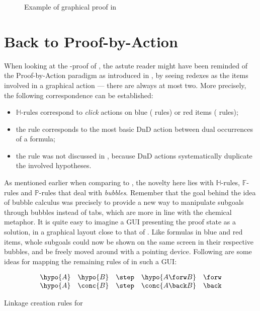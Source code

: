 \begin{figure*}
  
  \caption{Example of graphical proof in }
\end{figure*}

\section{Back to Proof-by-Action}

When looking at the -proof of , the astute reader
might have been reminded of the Proof-by-Action paradigm as introduced in
, by seeing redexes as the items involved in a graphical action ---
there are always at most two. More precisely, the following correspondence can
be established:
\begin{itemize}
  \item $\mathbb{H}$-rules correspond to \emph{click} actions on blue
  ({\rnm{\mcirc{-}}} rules) or red items ({\rnm{\mcirc{+}}} rules);
  \item the {} rule corresponds to the most basic DnD
  action between dual occurrences of a formula;
  \item the {} rule was not discussed in , because DnD
  actions systematically duplicate the involved hypotheses.
\end{itemize}
As mentioned earlier when comparing  to , the novelty here lies
with $\mathbb{H}$-rules, $\mathbb{F}$-rules and $\mathbb{P}$-rules that deal
with \emph{bubbles}. Remember that the goal behind the idea of bubble calculus
was precisely to provide a new way to manipulate subgoals through bubbles
instead of tabs, which are more in line with the chemical metaphor. It is quite
easy to imagine a GUI presenting the proof state as a solution, in a graphical
layout close to that of . Like formulas in blue and red
items, whole subgoals could now be shown on the same screen in their respective
bubbles, and be freely moved around with a pointing device. Following are some
ideas for mapping the remaining rules of  in such a GUI:

\begin{marginfigure}
  $$
  \begin{array}{rcll}
    \hypo{A}~~~\hypo{B} &\step &\hypo{A \forw B} &\forw \\
    \hypo{A}~~~\conc{B} &\step &\conc{A \back B} &\back \\
  \end{array}
  $$
  \caption{Linkage creation rules for }
\end{marginfigure}

